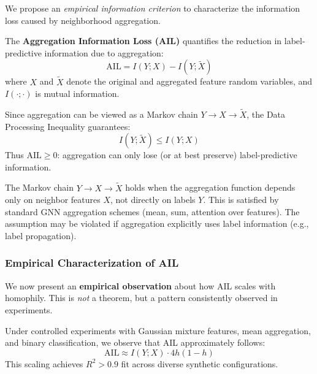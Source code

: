 We propose an \textit{empirical information criterion} to characterize the information loss caused by neighborhood aggregation.

\begin{definition}
\label{def:ail}
The \textbf{Aggregation Information Loss (AIL)} quantifies the reduction in label-predictive information due to aggregation:
\begin{equation}
    \text{AIL} = I(Y; X) - I(Y; \tilde{X})
\end{equation}
where $X$ and $\tilde{X}$ denote the original and aggregated feature random variables, and $I(\cdot; \cdot)$ is mutual information.
\end{definition}

\begin{proposition}
\label{prop:ail_dpi}
Since aggregation can be viewed as a Markov chain $Y \to X \to \tilde{X}$, the Data Processing Inequality guarantees:
\begin{equation}
    I(Y; \tilde{X}) \leq I(Y; X)
\end{equation}
Thus $\text{AIL} \geq 0$: aggregation can only lose (or at best preserve) label-predictive information.
\end{proposition}

\begin{remark}
\label{rem:markov_assumption}
The Markov chain $Y \to X \to \tilde{X}$ holds when the aggregation function depends only on neighbor features $X$, not directly on labels $Y$. This is satisfied by standard GNN aggregation schemes (mean, sum, attention over features). The assumption may be violated if aggregation explicitly uses label information (e.g., label propagation).
\end{remark}

\subsubsection{Empirical Characterization of AIL}

We now present an \textbf{empirical observation} about how AIL scales with homophily. This is \textit{not} a theorem, but a pattern consistently observed in experiments.

\begin{observation}
\label{obs:ail_scaling}
Under controlled experiments with Gaussian mixture features, mean aggregation, and binary classification, we observe that AIL approximately follows:
\begin{equation}
    \text{AIL} \approx I(Y; X) \cdot 4h(1-h)
\end{equation}
This scaling achieves $R^2 > 0.9$ fit across diverse synthetic configurations.
\end{observation}

